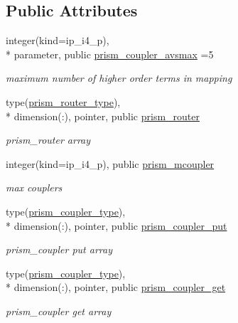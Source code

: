 \subsection*{Public Attributes}
\begin{DoxyCompactItemize}
\item 
integer(kind=ip\+\_\+i4\+\_\+p), \\*
parameter, public \hyperlink{classmod__oasis__coupler_a6f166f099a134dffba97a168d28a3c01}{prism\+\_\+coupler\+\_\+avsmax} =5
\begin{DoxyCompactList}\small\item\em maximum number of higher order terms in mapping \end{DoxyCompactList}\item 
type(\hyperlink{structmod__oasis__coupler_1_1prism__router__type}{prism\+\_\+router\+\_\+type}), \\*
dimension(\+:), pointer, public \hyperlink{classmod__oasis__coupler_a33dbf692ad73f83f73fe083e252badd8}{prism\+\_\+router}
\begin{DoxyCompactList}\small\item\em prism\+\_\+router array \end{DoxyCompactList}\item 
integer(kind=ip\+\_\+i4\+\_\+p), public \hyperlink{classmod__oasis__coupler_aaa019c39b0f657e7c37820697ecf354a}{prism\+\_\+mcoupler}
\begin{DoxyCompactList}\small\item\em max couplers \end{DoxyCompactList}\item 
type(\hyperlink{structmod__oasis__coupler_1_1prism__coupler__type}{prism\+\_\+coupler\+\_\+type}), \\*
dimension(\+:), pointer, public \hyperlink{classmod__oasis__coupler_ae59d8823993d9ca8610efd9770393271}{prism\+\_\+coupler\+\_\+put}
\begin{DoxyCompactList}\small\item\em prism\+\_\+coupler put array \end{DoxyCompactList}\item 
type(\hyperlink{structmod__oasis__coupler_1_1prism__coupler__type}{prism\+\_\+coupler\+\_\+type}), \\*
dimension(\+:), pointer, public \hyperlink{classmod__oasis__coupler_a96df3ef2ec1b53597bb9beca43fe8349}{prism\+\_\+coupler\+\_\+get}
\begin{DoxyCompactList}\small\item\em prism\+\_\+coupler get array \end{DoxyCompactList}\item 

\end{DoxyCompactItemize}
